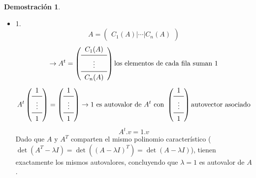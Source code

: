 \documentclass[11pt,a4paper]{article}
\theoremstyle{definition}
\newtheorem{demostracion}{Demostración}
\begin{document}
\begin{demostracion}
    \begin{itemize}
        \item 1.  
            \[
                A 
                = 
                \begin{pmatrix}
                    C_1(A) | \cdots | C_n (A) 
                \end{pmatrix}
            \] 
            \[
                \rightarrow A^t = 
                    \left(
                        \begin{array}{c}
                            C_1(A) \\
                            \midrule
                            \vdots \\
                            \midrule
                            C_n(A)
                        \end{array}
                    \right) \text{los elementos de cada fila suman $1$}
            \] 
            \[
                A^t 
                \left(
                    \begin{array}{c}
                        1 \\
                        \midrule
                        \vdots \\
                        \midrule
                        1
                    \end{array}
                \right)
                =
                \left(
                    \begin{array}{c}
                        1 \\
                        \midrule
                        \vdots \\
                        \midrule
                        1
                    \end{array}
                \right)
                \rightarrow \text{$1$ es autovalor de $A^t$ con }
                \left(
                    \begin{array}{c}
                        1 \\
                        \midrule
                        \vdots \\
                        \midrule
                        1
                    \end{array}
                \right)
                \text{autovector asociado}
            \]
            \[
                A^t.v = 1 . v
            \]
            Dado que $A$ y $A^T$ comparten el mismo polinomio característico ($\det(A^T - \lambda I) = \det({(A - \lambda I)}^T) = \det(A - \lambda I)$), tienen exactamente los mismos autovalores, concluyendo que $\lambda = 1$ es autovalor de $A$.

\end{itemize}
\end{demostracion}
\end{document}
